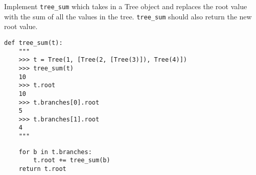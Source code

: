 \begin{blocksection}
\question Implement \lstinline$tree_sum$ which takes in a Tree
object and replaces the root value with the sum of all the values
in the tree. \lstinline$tree_sum$ should also return the new root
value.

\begin{lstlisting}
def tree_sum(t):
    """
    >>> t = Tree(1, [Tree(2, [Tree(3)]), Tree(4)])
    >>> tree_sum(t)
    10
    >>> t.root
    10
    >>> t.branches[0].root
    5
    >>> t.branches[1].root
    4
    """
\end{lstlisting}

\begin{solution}[1in]
\begin{lstlisting}
    for b in t.branches:
        t.root += tree_sum(b)
    return t.root
\end{lstlisting}
\end{solution}
\end{blocksection}
